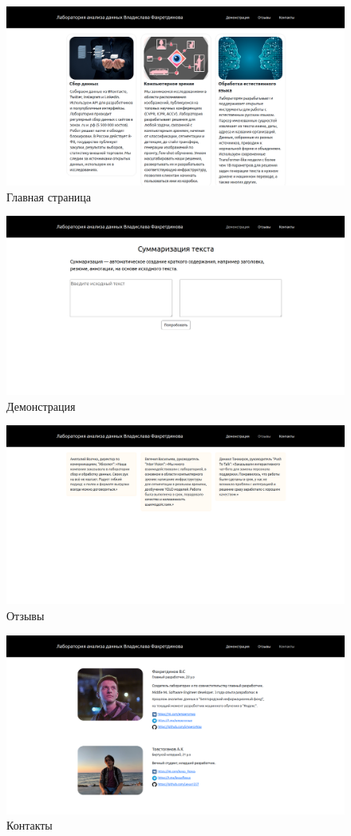 \documentclass{article}
\begin{document}
\begin{figure}[h!]
    \includegraphics[scale=0.28]{services.png}
    \caption{Главная страница}
\end{figure}

\begin{figure}[h!]
    \includegraphics[scale=0.28]{demo.png}
    \caption{Демонстрация}
\end{figure}

\begin{figure}[h!]
    \includegraphics[scale=0.28]{reviews.png}
    \caption{Отзывы}
\end{figure}

\begin{figure}[h!]
    \includegraphics[scale=0.28]{contacts.png}
    \caption{Контакты}
\end{figure}
 
\end{document}
